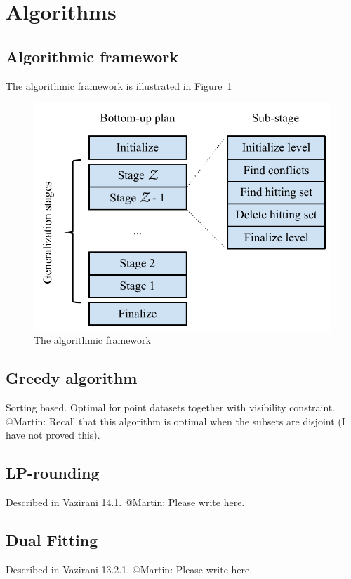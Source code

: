 \section{Algorithms}
\label{sec:algorithms}

\subsection{Algorithmic framework}

The algorithmic framework is illustrated in Figure~\ref{fig:algorithmic-framework}

\begin{figure}[htbp]
\begin{center}
\includegraphics[scale=.7]{figs/cvl_stages.pdf}
\caption{The algorithmic framework}
\label{fig:algorithmic-framework}
\end{center}
\end{figure}


\subsection{Greedy algorithm}
Sorting based. Optimal for point datasets together with visibility constraint. @Martin: Recall that this algorithm is optimal when the subsets are disjoint (I have not proved this). 

\subsection{LP-rounding}

Described in Vazirani 14.1. @Martin: Please write here.

\subsection{Dual Fitting}

Described in Vazirani 13.2.1. @Martin: Please write here.


